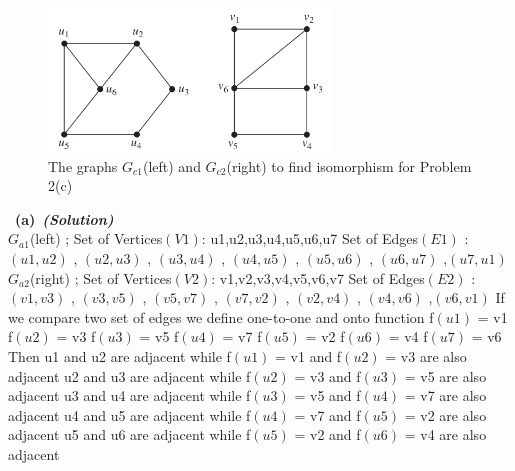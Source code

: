 \documentclass[a4 paper]{article}
\newcommand{\subproblem}[1]{~\newline\textbf{(#1)}}
\newcommand{\solutionx}{~\textbf{\textit{(Solution)}} }
\newcommand{\0}{\mathbf{0}}
\begin{document}
\begin{figure}[h]
    \centering
    \includegraphics[height=1.5in]{iso-c.png}
    \caption{The graphs $G_{c1}$(left) and $G_{c2}$(right) to find isomorphism for Problem 2(c)}
    \label{fig:G2c}
\end{figure}

\subproblem{a}\solutionx\\
$G_{a1}$(left) ; \newline
Set of Vertices$(V1)$: {u1,u2,u3,u4,u5,u6,u7} \newline
Set of Edges$(E1)$ : {$(u1,u2)$ , $(u2,u3)$ , $(u3,u4)$ , $(u4,u5)$ , $(u5,u6)$ , $(u6,u7)$ ,$(u7,u1)$} \newline
$G_{a2}$(right) ; \newline
Set of Vertices$(V2)$: {v1,v2,v3,v4,v5,v6,v7} \newline
Set of Edges$(E2)$ : {$(v1,v3)$ , $(v3,v5)$ , $(v5,v7)$ , $(v7,v2)$ , $(v2,v4)$ , $(v4,v6)$ ,$(v6,v1)$} \newline
If we compare two set of edges we define one-to-one and onto function\newline
f$(u1)$ = v1 \newline
f$(u2)$ = v3 \newline
f$(u3)$ = v5 \newline
f$(u4)$ = v7 \newline
f$(u5)$ = v2 \newline
f$(u6)$ = v4 \newline
f$(u7)$ = v6 \newline
Then \newline
u1 and u2 are adjacent  while f$(u1)$ = v1 and f$(u2)$ = v3 are also adjacent\newline
u2 and u3 are adjacent  while f$(u2)$ = v3 and f$(u3)$ = v5 are also adjacent\newline
u3 and u4 are adjacent  while f$(u3)$ = v5 and f$(u4)$ = v7 are also adjacent\newline
u4 and u5 are adjacent  while f$(u4)$ = v7 and f$(u5)$ = v2 are also adjacent\newline
u5 and u6 are adjacent  while f$(u5)$ = v2 and f$(u6)$ = v4 are also adjacent\newline
\end{document}
